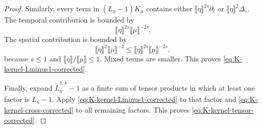 \documentclass{article}
\numberwithin{equation}{section}
\theoremstyle{plain}
\theoremstyle{definition}
\begin{document}
\begin{proof}
	Similarly, every term in \((L_\eta-1)K_\mu\) contains either
	\(\llbracket\eta\rrbracket^{2s}\partial_t\) or
	\(\llbracket\eta\rrbracket^2\Delta_\varepsilon\).  The temporal contribution
	is bounded by
	\[
	\llbracket\eta\rrbracket^{2s}
	\llbracket\mu\rrbracket^{-2s}.
	\]
	The spatial contribution is bounded by
	\[
	\llbracket\eta\rrbracket^2
	\llbracket\mu\rrbracket^{-2}
	\leq
	\llbracket\eta\rrbracket^{2s}
	\llbracket\mu\rrbracket^{-2s},
	\]
	because \(s\leq1\) and
	\(\llbracket\eta\rrbracket/\llbracket\mu\rrbracket\leq1\).
	Mixed terms are smaller.  This proves
	\eqref{eq:K-kernel-Lminus1-corrected}.
	
	Finally, expand
	\(\tilde L_\eta^{1,k}-1\) as a finite sum of tensor products in which at
	least one factor is \(L_\eta-1\).  Apply
	\eqref{eq:K-kernel-Lminus1-corrected} to that factor and
	\eqref{eq:K-kernel-cross-corrected} to all remaining factors.  This proves
	\eqref{eq:K-kernel-tensor-corrected}.
\end{proof}
\end{document}
